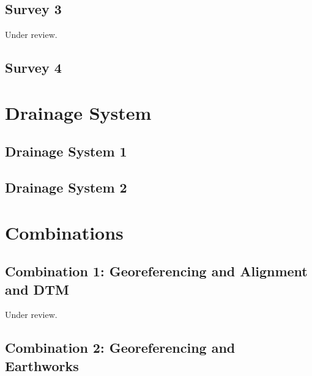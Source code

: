\documentclass{scrartcl}
\begin{document}
\subsection{Survey 3} %
\label{sec:survey_3}
Under review.%
\clearpage

\subsection{Survey 4} %
\label{sec:survey_4}
\clearpage


\section{Drainage System}

\subsection{Drainage System 1}
\label{sec:drainage_1}
\clearpage

\subsection{Drainage System 2}
\label{sec:drainage_2}
\clearpage

\section{Combinations}

\subsection{Combination 1: Georeferencing and Alignment and DTM} %
\label{sec:align_dtm_1}
Under review.%
\clearpage

\subsection{Combination 2: Georeferencing and Earthworks}
\label{sec:georef_earth_1}
\clearpage
\end{document}

